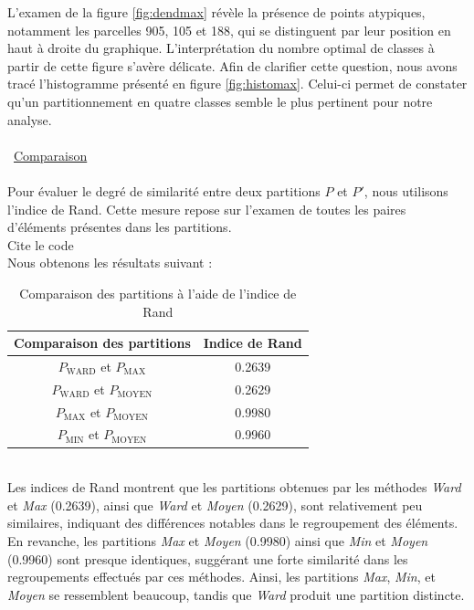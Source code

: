 \documentclass{article}
\begin{document}
L'examen de la figure \ref{fig:dendmax} révèle la présence de points atypiques, notamment les parcelles 905, 105 et 188, qui se distinguent par leur position en haut à droite du graphique. L'interprétation du nombre optimal de classes à partir de cette figure s'avère délicate. Afin de clarifier cette question, nous avons tracé l'histogramme présenté en figure \ref{fig:histomax}. Celui-ci permet de constater qu'un partitionnement en quatre classes semble le plus pertinent pour notre analyse.
\\\\

\textbullet\ \underline{Comparaison}
\\\\
Pour évaluer le degré de similarité entre deux partitions \( P \) et \( P' \), nous utilisons l'indice de Rand. Cette mesure repose sur l'examen de toutes les paires d'éléments présentes dans les partitions.
\\
Cite le code
\\
Nous obtenons les résultats suivant :
\begin{table}[ht]
    \centering
    \begin{tabular}{|c|c|}
    \hline
    \textbf{Comparaison des partitions} & \textbf{Indice de Rand} \\
    \hline
    \( P_{\text{WARD}} \) et \( P_{\text{MAX}} \) & 0.2639 \\
    \( P_{\text{WARD}} \) et \( P_{\text{MOYEN}} \) & 0.2629 \\
    \( P_{\text{MAX}} \) et \( P_{\text{MOYEN}} \) & 0.9980 \\
    \( P_{\text{MIN}} \) et \( P_{\text{MOYEN}} \) & 0.9960 \\
    \hline
    \end{tabular}
    \caption{Comparaison des partitions à l'aide de l'indice de Rand}
    \end{table}
\\
Les indices de Rand montrent que les partitions obtenues par les méthodes \textit{Ward} et \textit{Max} (0.2639), ainsi que \textit{Ward} et \textit{Moyen} (0.2629), sont relativement peu similaires, indiquant des différences notables dans le regroupement des éléments. En revanche, les partitions \textit{Max} et \textit{Moyen} (0.9980) ainsi que \textit{Min} et \textit{Moyen} (0.9960) sont presque identiques, suggérant une forte similarité dans les regroupements effectués par ces méthodes. Ainsi, les partitions \textit{Max}, \textit{Min}, et \textit{Moyen} se ressemblent beaucoup, tandis que \textit{Ward} produit une partition distincte.
\end{document}
